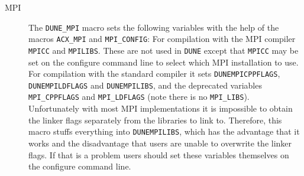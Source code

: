 \documentclass[11pt,a4paper,headinclude,footinclude,DIV16,normalheadings]{scrartcl}
\newcommand{\dune}{\texttt{DUNE}\xspace}
\begin{document}
\begin{description}
\item[MPI] The \texttt{DUNE\_MPI} macro sets the following variables with the
  help of the macros \texttt{ACX\_MPI} and \texttt{MPI\_CONFIG}: For
  compilation with the MPI compiler \texttt{MPICC} and \texttt{MPILIBS}.
  These are not used in \dune except that \texttt{MPICC} may be set on the
  configure command line to select which MPI installation to use.  For
  compilation with the standard compiler it sets \texttt{DUNEMPICPPFLAGS},
  \texttt{DUNEMPILDFLAGS} and \texttt{DUNEMPILIBS}, and the deprecated
  variables \texttt{MPI\_CPPFLAGS} and \texttt{MPI\_LDFLAGS} (note there is no
  \texttt{MPI\_LIBS}).  Unfortunately with most MPI implementations it is
  impossible to obtain the linker flags separately from the libraries to link
  to.  Therefore, this macro stuffs everything into \texttt{DUNEMPILIBS},
  which has the advantage that it works and the disadvantage that users are
  unable to overwrite the linker flags.  If that is a problem users should set
  these variables themselves on the configure command line.


\end{description}
\end{document}
